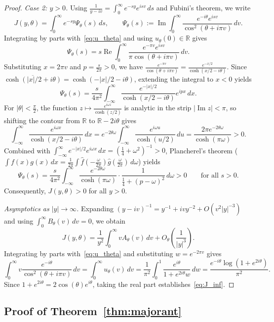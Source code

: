 \documentclass[11pt,a4paper]{amsart}
\theoremstyle{remark}
\numberwithin{equation}{section}
\newcommand{\R}{\mathbb{R}}
\begin{document}
\begin{proof}
\emph{Case 2: $y > 0$.} Using $\frac{1}{y-iv} = \int_0^\infty e^{-sy}e^{isv}\,ds$ and Fubini's theorem, we write
\[
  J(y,\theta) = \int_0^\infty e^{-sy}\Psi_\theta(s)\,ds, \qquad \Psi_\theta(s) := \operatorname{Im}\int_0^\infty \frac{e^{-i\theta}e^{isv}}{\cos^2(\theta+i\pi v)}\,dv.
\]
Integrating by parts with~\eqref{eq:u_theta} and using $u_\theta(0) \in \R$ gives
\[
  \Psi_\theta(s) = s\operatorname{Re}\int_0^\infty \frac{e^{-\pi v}e^{isv}}{\pi\cos(\theta+i\pi v)}\,dv.
\]
Substituting $x = 2\pi v$ and $p = \frac{s}{2\pi} > 0$, we have $\frac{e^{-\pi v}}{\cos(\theta+i\pi v)} = \frac{e^{-x/2}}{\cosh(x/2-i\theta)}$. Since $\overline{\cosh(|x|/2+i\theta)} = \cosh(-|x|/2-i\theta)$, extending the integral to $x < 0$ yields
\[
  \Psi_\theta(s) = \frac{s}{4\pi^2}\int_{-\infty}^\infty \frac{e^{-|x|/2}}{\cosh(x/2-i\theta)}e^{ipx}\,dx.
\]
For $|\theta| < \frac{\pi}{2}$, the function $z \mapsto \frac{e^{i\omega z}}{\cosh(z/2)}$ is analytic in the strip $|\operatorname{Im} z| < \pi$, so shifting the contour from $\R$ to $\R - 2i\theta$ gives
\[
  \int_{-\infty}^\infty \frac{e^{i\omega x}}{\cosh(x/2-i\theta)}\,dx = e^{-2\theta\omega}\int_{-\infty}^\infty \frac{e^{i\omega u}}{\cosh(u/2)}\,du = \frac{2\pi e^{-2\theta\omega}}{\cosh(\pi\omega)} > 0.
\]
Combined with $\int_{-\infty}^\infty e^{-|x|/2}e^{i\omega x}\,dx = (\frac{1}{4}+\omega^2)^{-1} > 0$, Plancherel's theorem ($\int f(x)g(x)\,dx = \frac{1}{2\pi}\int \widehat{f}(-\frac{\omega}{2\pi})\widehat{g}(\frac{\omega}{2\pi})\,d\omega$) yields
\[
  \Psi_\theta(s) = \frac{s}{4\pi^2}\int_{-\infty}^\infty \frac{e^{-2\theta\omega}}{\cosh(\pi\omega)}\cdot\frac{1}{\frac{1}{4}+(p-\omega)^2}\,d\omega > 0 \qquad \text{for all } s > 0.
\]
Consequently, $J(y,\theta) > 0$ for all $y > 0$.

\emph{Asymptotics as $|y| \to \infty$.} Expanding $(y-iv)^{-1} = y^{-1} + ivy^{-2} + O(v^2|y|^{-3})$ and using $\int_0^\infty B_\theta(v)\,dv = 0$, we obtain
\[
  J(y,\theta) = \frac{1}{y^2}\int_0^\infty vA_\theta(v)\,dv + O_\theta\!\left(\frac{1}{|y|^3}\right).
\]
Integrating by parts with~\eqref{eq:u_theta} and substituting $w = e^{-2\pi v}$ gives
\[
  \int_0^\infty v\frac{e^{-i\theta}}{\cos^2(\theta+i\pi v)}\,dv = \int_0^\infty u_\theta(v)\,dv = \frac{1}{\pi^2}\int_0^1 \frac{e^{i\theta}}{1+e^{2i\theta}w}\,dw = \frac{e^{-i\theta}\log(1+e^{2i\theta})}{\pi^2}.
\]
Since $1 + e^{2i\theta} = 2\cos(\theta)e^{i\theta}$, taking the real part establishes~\eqref{eq:J_inf}.
\end{proof}

\subsection{Proof of Theorem~\ref{thm:majorant}}
\end{document}
